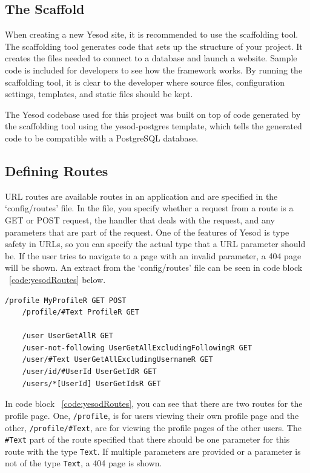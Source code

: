 \subsection{The Scaffold}
When creating a new Yesod site, it is recommended to use the scaffolding tool.
The scaffolding tool generates code that sets up the structure of your project. It
creates the files needed to connect to a database and launch a website. Sample code
is included for developers to see how the framework works. By running the scaffolding
tool, it is clear to the developer where source files, configuration settings, templates, and 
static files should be kept. \parencite[Scaffolding and the Site Template]{yesodBook}

The Yesod codebase used for this project was built on top of code generated by the
scaffolding tool using the yesod-postgres template, which tells the generated code
to be compatible with a PostgreSQL database.

\subsection{Defining Routes}

URL routes are available routes in an application and are specified in the 
`config/routes' file. In the file, you specify whether a request from a route is a
GET or POST request, the handler that deals with the request, and any parameters
that are part of the request. One of the features of Yesod is type safety in URLs,
so you can specify the actual type that a URL parameter should be. If the user
tries to navigate to a page with an invalid parameter, a 404 page will be shown.
An extract from the `config/routes' file can be seen in code block 
~\ref{code:yesodRoutes} below.


\begin{lstlisting}[caption={Yesod URL routes},label={code:yesodRoutes}]
    /profile MyProfileR GET POST
    /profile/#Text ProfileR GET
    
    /user UserGetAllR GET
    /user-not-following UserGetAllExcludingFollowingR GET
    /user/#Text UserGetAllExcludingUsernameR GET
    /user/id/#UserId UserGetIdR GET
    /users/*[UserId] UserGetIdsR GET
\end{lstlisting}

In code block ~\ref{code:yesodRoutes}, you can see that there
are two routes for the profile page. One, \texttt{/profile}, is for users
viewing their own profile page and the other, \texttt{/profile/\#Text}, are
for viewing the profile pages of the other users. The \texttt{\#Text} part
of the route specified that there should be one parameter for this
route with the type \texttt{Text}. If multiple parameters are provided or a parameter
is not of the type \texttt{Text}, a 404 page is shown.

